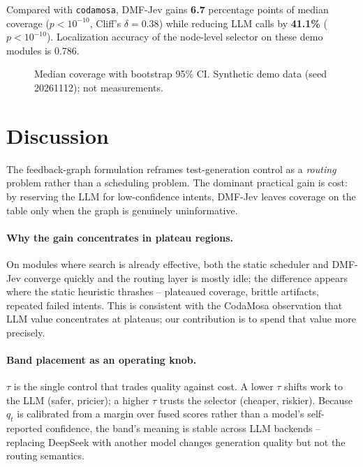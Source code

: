 \documentclass[11pt]{article}
\begin{document}
Compared with \texttt{codamosa}, DMF-Jev gains \textbf{6.7} percentage points of median coverage
($p<10^{-10}$, Cliff's $\delta=0.38$) while reducing LLM calls by
\textbf{41.1\%} ($p<10^{-10}$). Localization accuracy of the
node-level selector on these demo modules is 0.786.

\begin{figure}[h]
\centering
{}
\caption{Median coverage with bootstrap 95\% CI. Synthetic demo data (seed 20261112); not measurements.}
\label{fig:bars}
\end{figure}

\section{Discussion}
The feedback-graph formulation reframes test-generation control as a \emph{routing} problem rather than a scheduling problem. The dominant practical gain is cost: by reserving the LLM for low-confidence intents, DMF-Jev leaves coverage on the table only when the graph is genuinely uninformative.

\paragraph{Why the gain concentrates in plateau regions.}
On modules where search is already effective, both the static scheduler and DMF-Jev converge quickly and the routing layer is mostly idle; the difference appears where the static heuristic thrashes -- plateaued coverage, brittle artifacts, repeated failed intents. This is consistent with the CodaMosa observation that LLM value concentrates at plateaus; our contribution is to spend that value more precisely.

\paragraph{Band placement as an operating knob.}
$\tau$ is the single control that trades quality against cost. A lower $\tau$ shifts work to the LLM (safer, pricier); a higher $\tau$ trusts the selector (cheaper, riskier). Because $q_t$ is calibrated from a margin over fused scores rather than a model's self-reported confidence, the band's meaning is stable across LLM backends -- replacing DeepSeek with another model changes generation quality but not the routing semantics.
\end{document}
